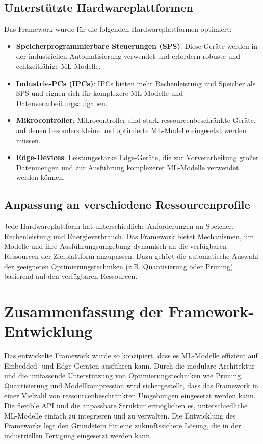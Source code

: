 \subsection{Unterstützte Hardwareplattformen}
Das Framework wurde für die folgenden Hardwareplattformen optimiert:
\begin{itemize}
    \item \textbf{Speicherprogrammierbare Steuerungen (SPS)}: Diese Geräte werden in der industriellen Automatisierung verwendet und erfordern robuste und echtzeitfähige 
    ML-Modelle.
    \item \textbf{Industrie-PCs (IPCs)}: IPCs bieten mehr Rechenleistung und Speicher als SPS und eignen sich für komplexere ML-Modelle und Datenverarbeitungsaufgaben.
    \item \textbf{Mikrocontroller}: Mikrocontroller sind stark ressourcenbeschränkte Geräte, auf denen besonders kleine und optimierte ML-Modelle eingesetzt werden müssen.
    \item \textbf{Edge-Devices}: Leistungsstarke Edge-Geräte, die zur Vorverarbeitung großer Datenmengen und zur Ausführung komplexerer ML-Modelle verwendet werden können.
\end{itemize}

\subsection{Anpassung an verschiedene Ressourcenprofile}
Jede Hardwareplattform hat unterschiedliche Anforderungen an Speicher, Rechenleistung und Energieverbrauch. Das Framework bietet Mechanismen, 
um Modelle und ihre Ausführungsumgebung dynamisch an die verfügbaren Ressourcen der Zielplattform anzupassen. Dazu gehört die automatische Auswahl der geeigneten 
Optimierungstechniken (z.B. Quantisierung oder Pruning) basierend auf den verfügbaren Ressourcen.

\section{Zusammenfassung der Framework-Entwicklung}
Das entwickelte Framework wurde so konzipiert, dass es ML-Modelle effizient auf Embedded- und Edge-Geräten ausführen kann. Durch die modulare Architektur und die 
umfassende Unterstützung von Optimierungstechniken wie Pruning, Quantisierung und Modellkompression wird sichergestellt, dass das Framework in einer Vielzahl von 
ressourcenbeschränkten Umgebungen eingesetzt werden kann. Die flexible API und die anpassbare Struktur ermöglichen es, unterschiedliche ML-Modelle einfach zu integrieren 
und zu verwalten. Die Entwicklung des Frameworks legt den Grundstein für eine zukunftssichere Lösung, die in der industriellen Fertigung eingesetzt werden kann.